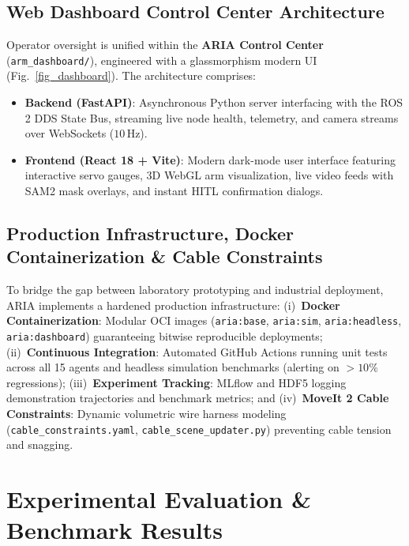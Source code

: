 \documentclass[journal]{IEEEtran}
\begin{document}
\subsection{Web Dashboard Control Center Architecture}
Operator oversight is unified within the \textbf{ARIA Control Center} (\texttt{arm\_dashboard/}), engineered with a glassmorphism modern UI (Fig.~\ref{fig_dashboard}). The architecture comprises:
\begin{itemize}
    \item \textbf{Backend (FastAPI)}: Asynchronous Python server interfacing with the ROS 2 DDS State Bus, streaming live node health, telemetry, and camera streams over WebSockets ($10$\,Hz).
    \item \textbf{Frontend (React 18 + Vite)}: Modern dark-mode user interface featuring interactive servo gauges, 3D WebGL arm visualization, live video feeds with SAM2 mask overlays, and instant HITL confirmation dialogs.
\end{itemize}

\subsection{Production Infrastructure, Docker Containerization \& Cable Constraints}
To bridge the gap between laboratory prototyping and industrial deployment, ARIA implements a hardened production infrastructure: (i)~\textbf{Docker Containerization}: Modular OCI images (\texttt{aria:base}, \texttt{aria:sim}, \texttt{aria:headless}, \texttt{aria:dashboard}) guaranteeing bitwise reproducible deployments; (ii)~\textbf{Continuous Integration}: Automated GitHub Actions running unit tests across all 15 agents and headless simulation benchmarks (alerting on $>10\%$ regressions); (iii)~\textbf{Experiment Tracking}: MLflow and HDF5 logging demonstration trajectories and benchmark metrics; and (iv)~\textbf{MoveIt 2 Cable Constraints}: Dynamic volumetric wire harness modeling (\texttt{cable\_constraints.yaml}, \texttt{cable\_scene\_updater.py}) preventing cable tension and snagging.

\section{Experimental Evaluation \& Benchmark Results}
\end{document}
